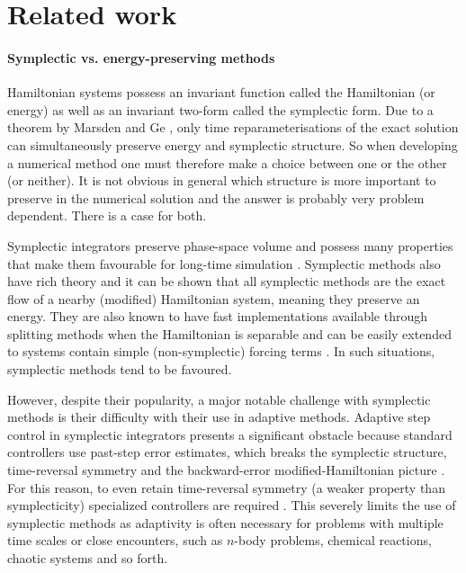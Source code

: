 \documentclass[final,3p,times]{elsarticle}
\begin{document}
\section{Related work}
\paragraph{Symplectic vs. energy-preserving methods} Hamiltonian systems possess an invariant function called the Hamiltonian (or energy) as well as an invariant two-form called the symplectic form. Due to a theorem by Marsden and Ge \cite{zhong1988lie}, only time reparameterisations of the exact solution can simultaneously preserve energy and symplectic structure. So when developing a numerical method one must therefore make a choice between one or the other (or neither). It is not obvious in general which structure is more important to preserve in the numerical solution and the answer is probably very problem dependent. There is a case for both. 

Symplectic integrators preserve phase-space volume and possess many properties that make them favourable for long-time simulation \cite{leimkuhler2004simulating}. Symplectic methods also have rich theory and it can be shown that all symplectic methods are the exact flow of a nearby (modified) Hamiltonian system, meaning they preserve an energy. They are also known to have fast implementations available through splitting methods \cite{mclachlan2002splitting} when the Hamiltonian is separable and can be easily extended to systems contain simple (non-symplectic) forcing terms \cite{tapley2022computational,tapley2019novel}. In such situations, symplectic methods tend to be favoured.

However, despite their popularity, a major notable challenge with symplectic methods is their difficulty with their use in adaptive methods. Adaptive step control in symplectic integrators presents a significant obstacle because standard controllers use past-step error estimates, which breaks the symplectic structure, time-reversal symmetry and the backward-error modified-Hamiltonian picture \cite{gladman1991symplectic}. For this reason, to even retain time-reversal symmetry (a weaker property than symplecticity) specialized controllers are required \cite{hairer2005explicit}. This severely limits the use of symplectic methods as adaptivity is often necessary for problems with multiple time scales or close encounters, such as $n$-body problems, chemical reactions, chaotic systems and so forth. 
\end{document}
